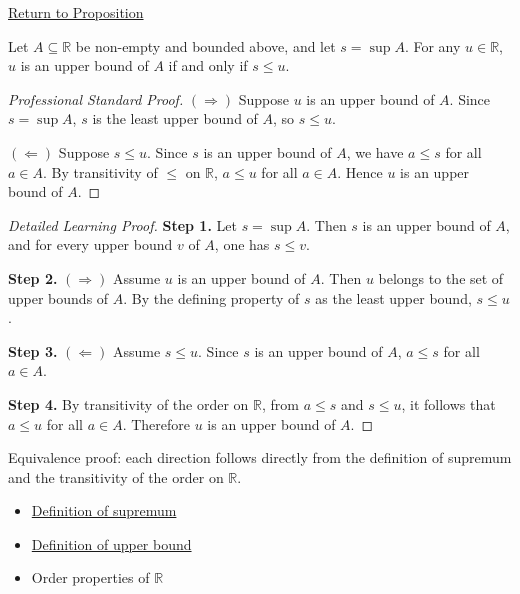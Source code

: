 \newpage
{}
\label{prf:upper-bound-comparison-with-the-supremum}

\begin{remark*}[Return]
\hyperref[prop:upper-bound-comparison-with-the-supremum]{Return to Proposition}
\end{remark*}

\begin{proposition*}
Let $A \subseteq \mathbb{R}$ be non-empty and bounded above, and let $s = \sup A$. For any $u \in \mathbb{R}$, $u$ is an upper bound of $A$ if and only if $s \le u$.
\end{proposition*}

\begin{proof}[Professional Standard Proof]
\LRAProofBodyStart
$(\Rightarrow)$ Suppose $u$ is an upper bound of $A$. Since $s = \sup A$, $s$ is the least upper bound of $A$, so $s \le u$.

$(\Leftarrow)$ Suppose $s \le u$. Since $s$ is an upper bound of $A$, we have $a \le s$ for all $a \in A$. By transitivity of $\le$ on $\mathbb{R}$, $a \le u$ for all $a \in A$. Hence $u$ is an upper bound of $A$.
\end{proof}

\begin{proof}[Detailed Learning Proof]
\LRAProofBodyStart

\textbf{Step 1.} Let $s = \sup A$. Then $s$ is an upper bound of $A$, and for every upper bound $v$ of $A$, one has $s \le v$.

\textbf{Step 2.} $(\Rightarrow)$ Assume $u$ is an upper bound of $A$. Then $u$ belongs to the set of upper bounds of $A$. By the defining property of $s$ as the least upper bound, $s \le u$.

\textbf{Step 3.} $(\Leftarrow)$ Assume $s \le u$. Since $s$ is an upper bound of $A$, $a \le s$ for all $a \in A$.

\textbf{Step 4.} By transitivity of the order on $\mathbb{R}$, from $a \le s$ and $s \le u$, it follows that $a \le u$ for all $a \in A$. Therefore $u$ is an upper bound of $A$.
\end{proof}

\begin{remark*}
Equivalence proof: each direction follows directly from the definition of supremum and the transitivity of the order on $\mathbb{R}$.
\end{remark*}

\begin{dependencies}
\begin{itemize}
  \item \hyperref[def:supremum]{Definition of supremum}
  \item \hyperref[def:upper-bound]{Definition of upper bound}
  \item Order properties of $\mathbb{R}$
\end{itemize}
\end{dependencies}

\clearpage
